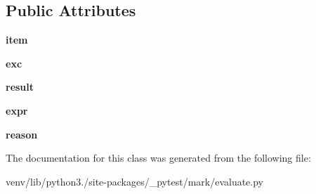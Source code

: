\subsection*{Public Attributes}
\begin{DoxyCompactItemize}
\item 
\mbox{\label{class__pytest_1_1mark_1_1evaluate_1_1_mark_evaluator_acf981cc78d178de2f7c7ed042262d939}} 
{\bfseries item}
\item 
\mbox{\label{class__pytest_1_1mark_1_1evaluate_1_1_mark_evaluator_a67fcd47999f4dba492c53a3d971ce92d}} 
{\bfseries exc}
\item 
\mbox{\label{class__pytest_1_1mark_1_1evaluate_1_1_mark_evaluator_add83c5e944833ace15e497f22d4d92bd}} 
{\bfseries result}
\item 
\mbox{\label{class__pytest_1_1mark_1_1evaluate_1_1_mark_evaluator_ac6322a833f9a535040aa282d1a9e7556}} 
{\bfseries expr}
\item 
\mbox{\label{class__pytest_1_1mark_1_1evaluate_1_1_mark_evaluator_a17c7991d5d5ea45037e7ede8ece0b81d}} 
{\bfseries reason}
\end{DoxyCompactItemize}


The documentation for this class was generated from the following file\+:\begin{DoxyCompactItemize}
\item 
venv/lib/python3./site-\/packages/\+\_\+pytest/mark/evaluate.\+py\end{DoxyCompactItemize}
